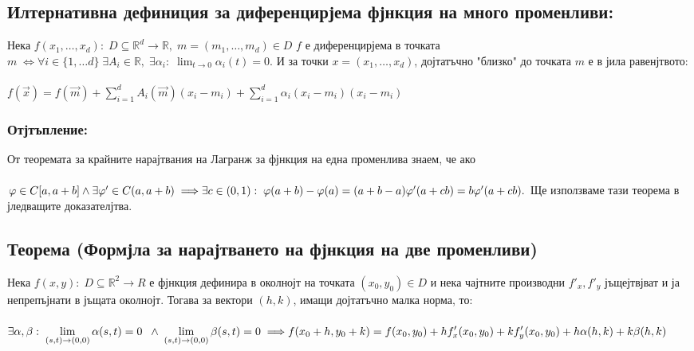 \documentclass[14pt]{extarticle}
\newcommand{\R}{\mathbb{R}}
\newcommand{\Sum}{\displaystyle\sum}
\newcommand{\Lim}[2]{\displaystyle\lim_{#1 \to #2}}
\newcommand{\Vector}[1]{\overrightarrow{#1}}
\begin{document}
\subsection*{Илтернативна дефиниция за диференцирјема фјнкция на много променливи:}
Нека \(f(x_1, \dots, x_d) : \; D \subseteq \R^d \to \R, \; m = (m_1, \dots, m_d) \in D \) \(f\) е диференцирјема в точката \(m \; \iff
\forall i \in \{1, \dots d\} \; \exists A_i \in \R, \; \exists \alpha_i : \; \Lim{t}{0} \alpha_i(t) = 0 \). И за точки \(x = (x_1, \dots, x_d)\), дојтатъчно "близко" до точката \(m\) е в јила равенјтвото: \\\\
\(f(\Vector{x}) = f(\Vector{m}) + \Sum_{i = 1}^d A_i(\Vector{m})(x_i - m_i) + \Sum_{i = 1}^d \alpha_{i}(x_i - m_i)(x_i - m_i) \)
\subsubsection*{Отјтъпление:}
От теоремата за крайните нарајтвания на Лагранж за фјнкция на една променлива знаем, че ако \\\\
\(\varphi \in C[a, a + b] \land \exists \varphi' \in C(a, a + b) \implies \\\\
\exists c \in (0, 1) : \; \varphi(a + b) - \varphi(a) = (a + b - a)\varphi'(a + cb) = b\varphi'(a + cb).\) Ще използваме тази теорема в јледващите доказателјтва.
\subsection*{Теорема (Формјла за нарајтването на фјнкция на две променливи)}
Нека \(f(x, y) : \; D \subseteq \R^2 \to R\) е фјнкция дефинира в околнојт на точката \((x_0, y_0) \in D\) и нека чајтните производни \(f'_x, f'_y\) јъщејтвјват и ја непрепъјнати в јъщата околнојт. Тогава за вектори \((h, k)\), имащи дојтатъчно малка норма, то: \\\\
\(\exists \alpha, \beta : \; \Lim{(s, t)}{(0, 0)} \alpha(s, t) = 0 \; \; \land \; \Lim{(s, t)}{(0, 0)} \beta(s, t) = 0 \implies \\\\
f(x_0 + h, y_0 + k) = f(x_0, y_0) + hf'_x(x_0, y_0) + kf'_y(x_0, y_0) + h\alpha(h, k) + k\beta(h,k) \)
\end{document}
